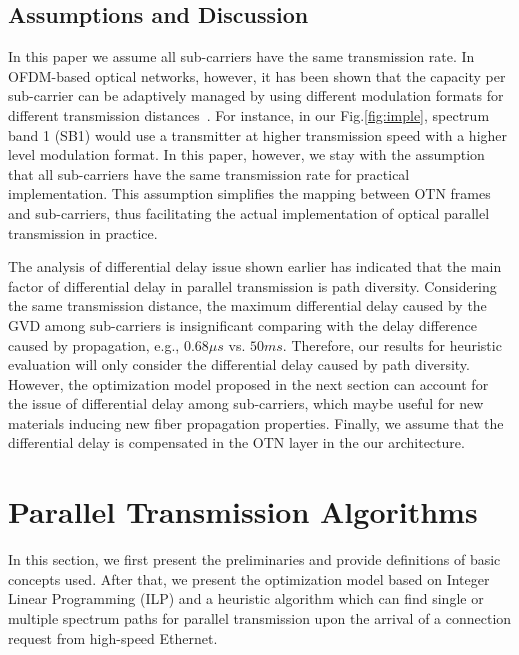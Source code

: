 \documentclass[conference]{IEEEtran}
\begin{document}
 \subsection{Assumptions and Discussion}
\par In this paper we assume all sub-carriers have the same transmission rate. In OFDM-based optical networks,  however, it has 
been shown that the capacity per sub-carrier can be adaptively managed by using different modulation formats for 
different transmission distances~\cite{Christo:JLT:2011}\cite{Jinno:2010}. For 
instance, in our Fig.\ref{fig:imple}, spectrum band 1 (SB1) would use a transmitter at higher transmission speed with a higher level modulation format. In this paper, however, we stay with  the assumption that all sub-carriers have 
the same transmission rate for practical implementation.  This assumption  simplifies the  mapping between OTN frames and sub-carriers, thus  facilitating the actual implementation of optical parallel transmission in practice. 
\par The analysis of differential delay issue shown earlier has indicated that the main factor of differential delay in parallel transmission is path diversity. Considering the same transmission distance, the maximum differential delay caused by the GVD among sub-carriers is insignificant comparing with the delay difference caused by propagation, e.g., $0.68\mu s$ vs. $50ms$.  Therefore, our results  for heuristic evaluation will only consider the differential delay caused by path diversity. However, the optimization model proposed in the next section can account for the issue of differential delay among  sub-carriers, which maybe useful for new materials inducing new   fiber propagation properties. Finally, we assume that the differential delay is compensated in the OTN layer in the our architecture.


\section{Parallel Transmission Algorithms}\label{algo}
In this section, we first present the preliminaries and provide definitions of basic concepts used. After that, we present the optimization model based on Integer Linear Programming (ILP) and a heuristic algorithm which can find single or multiple spectrum paths for parallel transmission upon the arrival of a connection 
request from high-speed Ethernet.    
\end{document}
